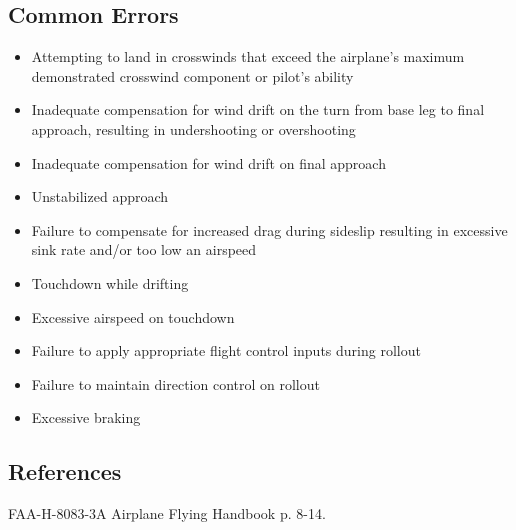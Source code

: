 \subsection{Common Errors}

\begin{itemize}
  \item Attempting to land in crosswinds that exceed the airplane's maximum
    demonstrated crosswind component or pilot's ability
  \item Inadequate compensation for wind drift on the turn from base leg to final
    approach, resulting in undershooting or overshooting
  \item Inadequate compensation for wind drift on final approach
  \item Unstabilized approach
  \item Failure to compensate for increased drag during sideslip resulting in
    excessive sink rate and/or too low an airspeed
  \item Touchdown while drifting
  \item Excessive airspeed on touchdown
  \item Failure to apply appropriate flight control inputs during rollout
  \item Failure to maintain direction control on rollout
  \item Excessive braking
\end{itemize}

\subsection{References}

FAA-H-8083-3A Airplane Flying Handbook p. 8-14.

